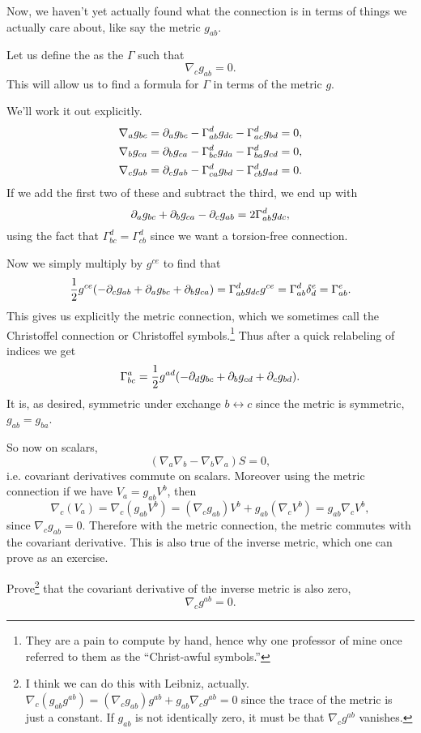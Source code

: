 Now, we haven't yet actually found what the connection is in terms of things we actually care about, like say the metric $g_{ab}.$
\begin{defn}
Let us define the  as the $\Gamma$ such that
$$\nabla_c g_{ab}=0.$$
This will allow us to find a formula for $\Gamma$ in terms of the metric $g$.
\end{defn}

We'll work it out explicitly.
\begin{align*}
\nabla_a g_{bc}&=\partial_a g_{bc}-\Gamma^d_{ab}g_{dc}-\Gamma^d_{ac}g_{bd}=0,\\
\nabla_b g_{ca}&=\partial_b g_{ca}-\Gamma^d_{bc} g_{da} - \Gamma^d_{ba}g_{cd}=0,\\
\nabla_c g_{ab}&=\partial_c g_{ab}-\Gamma^d_{ca} g_{bd}-\Gamma^d_{cb}g_{ad}=0.
\end{align*}
If we add the first two of these and subtract the third, we end up with
$$\partial_a g_{bc}+\partial_b g_{ca} - \partial_c g_{ab} = 2\Gamma^d_{ab} g_{dc},$$
using the fact that $\Gamma^d_{bc}=\Gamma^d_{cb}$ since we want a torsion-free connection.

Now we simply multiply by $g^{ce}$ to find that
$$\frac{1}{2}g^{ce}(-\partial_c g_{ab} +\partial_a g_{bc} +\partial_b g_{ca})=\Gamma^d_{ab} g_{dc} g^{ce} =\Gamma^d_{ab} \delta^e_d = \Gamma^e_{ab}.$$
This gives us explicitly the metric connection, which we sometimes call the Christoffel connection or Christoffel symbols.\footnote{They are a pain to compute by hand, hence why one professor of mine once referred to them as the ``Christ-awful symbols.''} Thus after a quick relabeling of indices we get
$$\Gamma^a_{bc}=\frac{1}{2} g^{ad}(-\partial_d g_{bc}+\partial_b g_{cd} + \partial_c g_{bd}).$$
It is, as desired, symmetric under exchange $b\leftrightarrow c$ since the metric is symmetric, $g_{ab}=g_{ba}$.

So now on scalars,
$$(\nabla_a \nabla_b -\nabla_b \nabla_a)S=0,$$
i.e. covariant derivatives commute on scalars. Moreover using the metric connection if we have $V_a =g_{ab} V^b$, then
$$\nabla_c(V_a)=\nabla_c (g_{ab} V^b)=(\nabla_c g_{ab}) V^b+ g_{ab}(\nabla_c V^b)= g_{ab}\nabla_c V^b,$$
since $\nabla_c g_{ab}=0$. Therefore with the metric connection, the metric commutes with the covariant derivative. This is also true of the inverse metric, which one can prove as an exercise.

\begin{ex}
Prove\footnote{I think we can do this with Leibniz, actually. $\nabla_c(g_{ab}g^{ab})=(\nabla_c g_{ab}) g^{ab}+g_{ab} \nabla_c g^{ab} = 0$ since the trace of the metric is just a constant. If $g_{ab}$ is not identically zero, it must be that $\nabla_c g^{ab}$ vanishes.} that the covariant derivative of the inverse metric is also zero,
$$\nabla_c g^{ab}=0.$$
\end{ex}